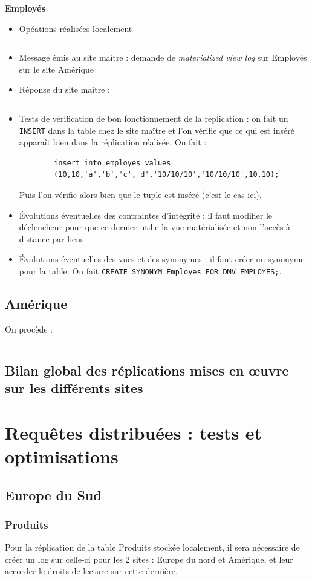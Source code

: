 \documentclass[10pt,a4paper]{article}
\theoremstyle{plain}
\begin{document}
\textbf{Employés}
\begin{itemize}
    \item Opéations réalisées localement
    \inputminted{sql}{EUS_V-A-5-b1.sql}
    \item Message émis au site maître : demande de \emph{materialized view log} sur Employés sur le site Amérique
    \item Réponse du site maître : \inputminted{sql}{EUS_V-A-5-b3.sql}
    \item Tests de vérification de bon fonctionnement de la réplication : on fait un \verb|INSERT| dans la table chez le site maître et l'on vérifie que ce qui est inséré apparaît bien dans la réplication réalisée.
    On fait :
    \begin{verbatim}
    	insert into employes values
    	(10,10,'a','b','c','d','10/10/10','10/10/10',10,10);
    \end{verbatim}
    Puis l'on vérifie alors bien que le tuple est inséré (c'est le cas ici).
    \item Évolutions éventuelles des contraintes d'intégrité : il faut modifier le déclencheur pour que ce dernier utilie la vue matérialisée et non l'accès à distance par liens.
    \item Évolutions éventuelles des vues et des synonymes : il faut créer un synonyme pour la table. On fait \verb|CREATE SYNONYM Employes FOR DMV_EMPLOYES;|.
\end{itemize}
\newpage 

\subsection{Amérique}
On procède :
\inputminted{sql}{AM_Replica.sql}

\subsection{Bilan global des réplications mises en \oe uvre sur les différents sites}
\newpage 

\section{Requêtes distribuées : tests et optimisations}
\subsection{Europe du Sud}
\subsubsection{Produits}
Pour la réplication de la table Produits stockée localement, il sera nécessaire de créer un log sur celle-ci pour les 2 sites : Europe du nord et Amérique, et leur accorder le droits de lecture sur cette-dernière.
\end{document}
